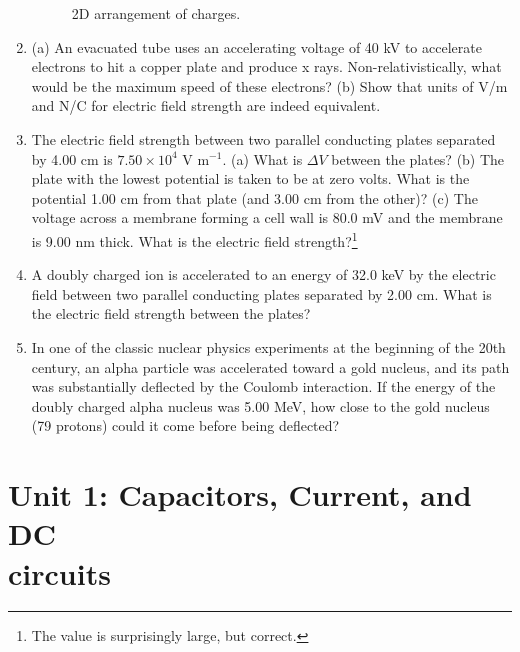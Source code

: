 \documentclass[12pt,twocolumn]{article}
\begin{document}
\begin{enumerate}
\begin{figure}[hb]
\caption{\label{fig:e-field_2} 2D arrangement of charges.}
\end{figure} \vspace{3cm}
\item (a) An evacuated tube uses an accelerating voltage of 40 kV to accelerate electrons to hit a copper plate and produce x rays. Non-relativistically, what would be the maximum speed of these electrons? (b)  Show that units of V/m and N/C for electric field strength are indeed equivalent. \\ \vspace{3cm}
\item The electric field strength between two parallel conducting plates separated by 4.00 cm is $7.50 \times 10^4$ V m$^{-1}$. (a) What is $\Delta V$ between the plates? (b) The plate with the lowest potential is taken to be at zero volts. What is the potential 1.00 cm from that plate (and 3.00 cm from the other)? (c) The voltage across a membrane forming a cell wall is 80.0 mV and the membrane is 9.00 nm thick. What is the electric field strength?\footnote{The value is surprisingly large, but correct.} \\ \vspace{4cm}
\item A doubly charged ion is accelerated to an energy of 32.0 keV by the electric field between two parallel conducting plates separated by 2.00 cm. What is the electric field strength between the plates? \\ \vspace{2cm}
\item In one of the classic nuclear physics experiments at the beginning of the 20th century, an alpha particle was accelerated toward a gold nucleus, and its path was substantially deflected by the Coulomb interaction. If the energy of the doubly charged alpha nucleus was 5.00 MeV, how close to the gold nucleus (79 protons) could it come before being deflected? \\ \vspace{3cm}
\end{enumerate}

\section{Unit 1: Capacitors, Current, and DC \\ circuits}
\end{document}

